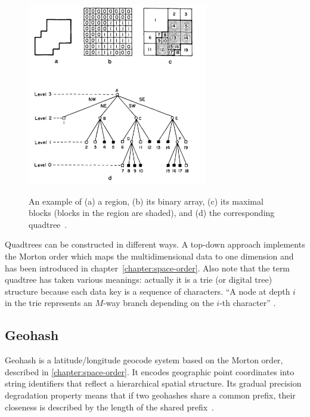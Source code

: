 \begin{figure}[h]
  \begin{center}
    \includegraphics[width=0.7\textwidth]{figures/quadtree.png}
    \label{fig:space-decompositions}
    \caption{An example of (a) a region, (b) its binary array, (c) its maximal blocks (blocks in the region are shaded), and (d) the corresponding quadtree~\cite[p 3]{Samet90spatialdata}.}
  \end{center}
\end{figure}

Quadtrees can be constructed in different ways. A top-down approach implements the Morton order which maps the multidimensional data to one dimension and has been introduced in chapter~\ref{chapter:space-order}. Also note that the term quadtree has taken various meanings: actually it is a trie (or digital tree) structure because each data key is a sequence of characters. ``A node at depth $i$ in the trie represents an $M$-way branch depending on the $i$-th character'' \cite{Samet90spatialdata}.

\subsection{Geohash}
\label{chapter:geohash}

Geohash is a latitude/longitude geocode system based on the Morton order, described in \ref{chapter:space-order}. It encodes geographic point coordinates into string identifiers that reflect a hierarchical spatial structure. Its gradual precision degradation property means that if two geohashes share a common prefix, their closeness is described by the length of the shared prefix~\cite{wiki:geohash, Smiley11geohash}.

